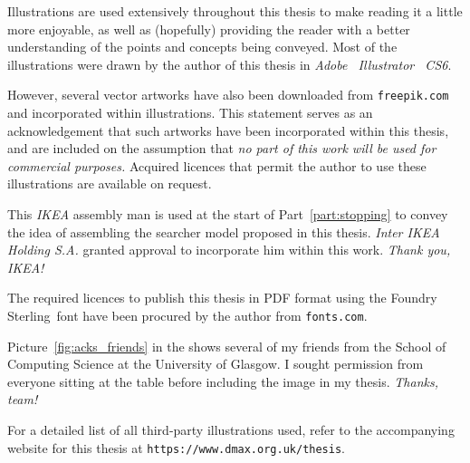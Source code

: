 
\begin{preamble}

Illustrations are used extensively throughout this thesis to make reading it a little more enjoyable, as well as (hopefully) providing the reader with a better understanding of the points and concepts being conveyed. Most of the illustrations were drawn by the author of this thesis in \emph{Adobe \textregistered~Illustrator \textregistered~CS6}.

However, several vector artworks have also been downloaded from \texttt{freepik.com} and incorporated within illustrations. This statement serves as an acknowledgement that such artworks have been incorporated within this thesis, and are included on the assumption that \textit{no part of this work will be used for commercial purposes.} Acquired licences that permit the author to use these illustrations are available on request.

This \textit{IKEA} assembly man is used at the start of Part~\ref{part:stopping} to convey the idea of assembling the searcher model proposed in this thesis. \emph{Inter IKEA Holding S.A.} granted approval to incorporate him within this work. \emph{Thank you, IKEA!}

The required licences to publish this thesis in PDF format using the \headerfont\selectfont Foundry Sterling\normalfont\selectfont~font have been procured by the author from \texttt{fonts.com}.

Picture~\ref{fig:acks_friends} in the  shows several of my friends from the School of Computing Science at the University of Glasgow. I sought permission from everyone sitting at the table before including the image in my thesis. \emph{Thanks, team!}

For a detailed list of all third-party illustrations used, refer to the accompanying website for this thesis at \texttt{https://www.dmax.org.uk/thesis}.

\end{preamble}

\newpage